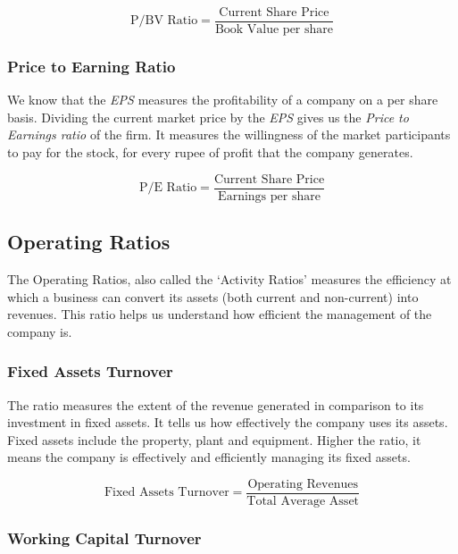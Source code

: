 \begin{displaymath}
  \textrm{P/BV Ratio} = \frac{\textrm{Current Share Price}}{\textrm{Book Value per share}}
\end{displaymath}

\subsubsection{Price to Earning Ratio}
We know that the \emph{EPS} measures the profitability of a company on a per share basis. Dividing the current market price by the \emph{EPS} gives us the \emph{Price to Earnings ratio} of the firm. It measures the willingness of the market participants to pay for the stock, for every rupee of profit that the company generates.

\begin{displaymath}
  \textrm{P/E Ratio} = \frac{\textrm{Current Share Price}}{\textrm{Earnings per share}}
\end{displaymath}

\subsection{Operating Ratios}
The Operating Ratios, also called the ‘Activity Ratios’ measures the efficiency at which a business can convert its assets (both current and non-current) into revenues. This ratio helps us understand how efficient the management of the company is.

\subsubsection{Fixed Assets Turnover}
The ratio measures the extent of the revenue generated in comparison to its investment in fixed assets. It tells us how effectively the company uses its assets. Fixed assets include the property, plant and equipment. Higher the ratio, it means the company is effectively and efficiently managing its fixed assets.

\begin{displaymath}
  \textrm{Fixed Assets Turnover} = \frac{\textrm{Operating Revenues}}{\textrm{Total Average Asset}}
\end{displaymath}

\subsubsection{Working Capital Turnover}


